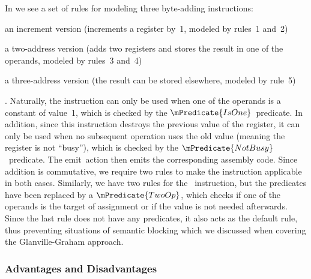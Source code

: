 In  we see a set of \glspl{rule} for
modeling three byte-adding \glspl{instruction}:
%
\begin{enumerate*}[label=(\roman*), itemjoin={;\ }, itemjoin*={; and\ }]
  \item an increment version  (increments a \gls{register} by~1,
    modeled by \glspl{rule}~1 and~2)
  \item a two-address version  (adds two \glspl{register} and
    stores the result in one of the operands, modeled by \glspl{rule}~3 and~4)
  \item a three-address version  (the result can be stored
    elsewhere, modeled by rule~5)
\end{enumerate*}.
%
Naturally, the  \gls{instruction} can only be used when one of the
operands is a constant of value~1, which is checked by the
$\mPredicate{IsOne}$~\gls{predicate}.
%
In addition, since this \gls{instruction} destroys the previous value of the
\gls{register}, it can only be used when no subsequent operation uses the old
value (meaning the \gls{register} is not ``busy''), which is checked by the
$\mPredicate{NotBusy}$~\gls{predicate}.
%
The emit~\gls{action} then emits the corresponding \gls{assembly code}.
%
Since addition is commutative, we require two \glspl{rule} to make the
\gls{instruction} applicable in both cases.
%
Similarly, we have two \glspl{rule} for the ~\gls{instruction},
but the \glspl{predicate} have been replaced by a $\mPredicate{TwoOp}$, which
checks if one of the operands is the target of assignment or if the value is not
needed afterwards.
%
Since the last \gls{rule} does not have any \glspl{predicate}, it also acts as
the default \gls{rule}, thus preventing situations of \gls{semantic blocking}
which we discussed when covering the \gls{Glanville-Graham approach}.


\subsubsection{Advantages and Disadvantages}

